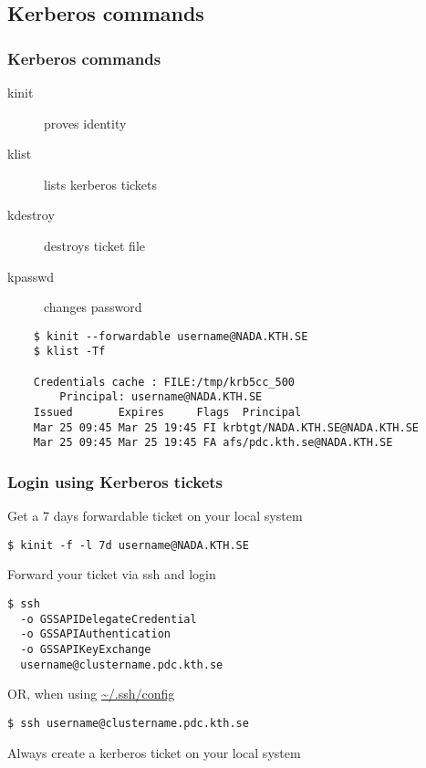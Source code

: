 \subsection*{Kerberos commands}

\begin{frame}[fragile]
\frametitle{Kerberos commands}
\begin{description}
 \item [kinit] proves identity
 \item [klist] lists kerberos tickets
 \item [kdestroy] destroys ticket file
 \item [kpasswd] changes password
\end{description}
\scriptsize
\begin{block}{}
  \begin{verbatim}
    $ kinit --forwardable username@NADA.KTH.SE
    $ klist -Tf
    
    Credentials cache : FILE:/tmp/krb5cc_500
        Principal: username@NADA.KTH.SE
    Issued       Expires     Flags  Principal
    Mar 25 09:45 Mar 25 19:45 FI krbtgt/NADA.KTH.SE@NADA.KTH.SE
    Mar 25 09:45 Mar 25 19:45 FA afs/pdc.kth.se@NADA.KTH.SE
\end{verbatim}
\end{block}
\end{frame}


\begin{frame}[fragile]
\frametitle{Login using Kerberos tickets}

\begin{block}{Get a 7 days forwardable ticket on your local system}
\begin{verbatim}
$ kinit -f -l 7d username@NADA.KTH.SE
\end{verbatim}
\end{block}

\begin{block}{Forward your ticket via ssh and login}
\begin{verbatim}
$ ssh
  -o GSSAPIDelegateCredential 
  -o GSSAPIAuthentication 
  -o GSSAPIKeyExchange 
  username@clustername.pdc.kth.se
\end{verbatim}
\end{block}

\begin{block}{OR, when using \url{~/.ssh/config}}
\begin{verbatim}
$ ssh username@clustername.pdc.kth.se
\end{verbatim}
\end{block}

\alert{Always create a kerberos ticket on your local system}
\end{frame}
